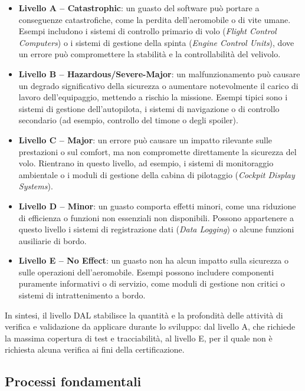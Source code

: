 \documentclass[italian, Lau, oneside]{sapthesis} %
\begin{document}
\begin{itemize}
    \item \textbf{Livello A – Catastrophic}: un guasto del software può portare a conseguenze catastrofiche, come la perdita dell’aeromobile o di vite umane.  
    Esempi includono i sistemi di controllo primario di volo (\emph{Flight Control Computers}) o i sistemi di gestione della spinta (\emph{Engine Control Units}), dove un errore può compromettere la stabilità e la controllabilità del velivolo.
    
    \item \textbf{Livello B – Hazardous/Severe-Major}: un malfunzionamento può causare un degrado significativo della sicurezza o aumentare notevolmente il carico di lavoro dell’equipaggio, mettendo a rischio la missione.  
    Esempi tipici sono i sistemi di gestione dell’autopilota, i sistemi di navigazione o di controllo secondario (ad esempio, controllo del timone o degli spoiler).
    
    \item \textbf{Livello C – Major}: un errore può causare un impatto rilevante sulle prestazioni o sul comfort, ma non compromette direttamente la sicurezza del volo.  
    Rientrano in questo livello, ad esempio, i sistemi di monitoraggio ambientale o i moduli di gestione della cabina di pilotaggio (\emph{Cockpit Display Systems}).
    
    \item \textbf{Livello D – Minor}: un guasto comporta effetti minori, come una riduzione di efficienza o funzioni non essenziali non disponibili.  
    Possono appartenere a questo livello i sistemi di registrazione dati (\emph{Data Logging}) o alcune funzioni ausiliarie di bordo.
    
    \item \textbf{Livello E – No Effect}: un guasto non ha alcun impatto sulla sicurezza o sulle operazioni dell’aeromobile.  
    Esempi possono includere componenti puramente informativi o di servizio, come moduli di gestione non critici o sistemi di intrattenimento a bordo.
\end{itemize}

In sintesi, il livello DAL stabilisce la quantità e la profondità delle attività di verifica e validazione da applicare durante lo sviluppo: dal livello A, che richiede la massima copertura di test e tracciabilità, al livello E, per il quale non è richiesta alcuna verifica ai fini della certificazione.

\newpage
\subsection{Processi fondamentali}
\end{document}
